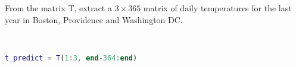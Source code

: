 From the matrix T, extract a $3 \times 365$ matrix of daily temperatures for the last year in Boston, Providence and Washington DC.

\begin{solution} \ \\
\begin{lstlisting}[language=Matlab]
t_predict = T(1:3, end-364:end)
\end{lstlisting}
\end{solution}

